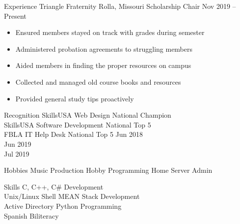 \documentclass[
    name = {{Evan Elias Young}},
    web = {{EvanEliasYoung.com}},
    schooladdr = {{1300 Whitney Lane; Rolla, Missouri 65401 ; eeymrr@mst.edu}},
    homeaddr = {{403 Valparaiso Court; Valley Park, Missouri 63088 ; +1 (314) 277-7058}},
]{eey-resume}
\begin{document}
\begin{eeyrssection}{Experience}
    \eeyrsposition%
        {Triangle Fraternity}%
        {Rolla, Missouri}%
        {Scholarship Chair}%
        {Nov 2019 -- Present}%
        {%
            \begin{itemize}
                \item Ensured members stayed on track with grades during semester
                \item Administered probation agreements to struggling members
                \item Aided members in finding the proper resources on campus
                \item Collected and managed old course books and resources
                \item Provided general study tips proactively
            \end{itemize}
        }
\end{eeyrssection}

\begin{eeyrssection}{Recognition}
    \eeyrstwoone%
        {%
            SkillsUSA Web Design National Champion\\
            SkillsUSA Software Development National Top 5\\
		    FBLA IT Help Desk National Top 5
        }%
        {%
            Jun 2018\\
            Jun 2019\\
            Jul 2019
        }
\end{eeyrssection}

\begin{eeyrssection}{Hobbies}
    \eeyrsthirds%
        {Music Production}%
        {Hobby Programming}%
        {Home Server Admin}
\end{eeyrssection}

\begin{eeyrssection}{Skills}
    \eeyrsthirds%
        {%
            C, C++, C\# Development\\
            Unix/Linux Shell
        }%
        {%
            MEAN Stack Development\\
            Active Directory
        }%
        {%
            Python Programming\\
            Spanish Biliteracy
        }
\end{eeyrssection}
\end{document}
